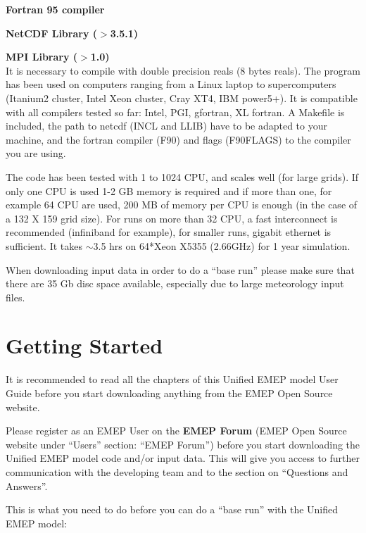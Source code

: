 \textbf{Fortran 95 compiler}

\textbf{NetCDF Library ($>$3.5.1)}

\textbf{MPI Library ($>$1.0)}\\

It is necessary to compile with double precision reals (8 bytes
reals). The program has been used on computers ranging from a Linux laptop to supercomputers 
(Itanium2 cluster, Intel Xeon cluster, Cray XT4, IBM power5+). It is compatible with all 
compilers tested so far:  Intel, PGI, gfortran, XL fortran. A Makefile is included,  
the path to netcdf (INCL and LLIB) have to be adapted to your machine, and the fortran 
compiler (F90) and flags (F90FLAGS) to the compiler you are using.



The code has been tested with 1 to 1024 CPU, and scales well (for large grids).  If only one 
CPU is used 1-2 GB memory is required and if more than one,
for example 64 CPU are used, 200 MB of memory per CPU is enough (in
the case of a 132 X 159 grid size). For runs on more than 32 CPU, a fast interconnect is 
recommended (infiniband for example), for smaller runs, gigabit ethernet is sufficient. 
It takes $\sim$3.5 hrs on 64*Xeon X5355 (2.66GHz) for 1 year simulation.

When downloading input data in order to do a ``base run'' please make
sure that there are 35 Gb disc space available, especially due to
large meteorology input files.

 

\section{Getting Started}


It is recommended to read all the chapters of this Unified EMEP model
User Guide before you start downloading anything from the EMEP Open
Source website.

Please register as an EMEP User on the {\bf EMEP Forum}
(EMEP Open Source website under ``Users'' section: ``EMEP Forum'')
before you start downloading the Unified EMEP model code and/or input
data. This will give you access to further communication with the
developing team and to the section on ``Questions and Answers''. 


This is what you need to do before you can do a ``base run'' with the
Unified EMEP model:

